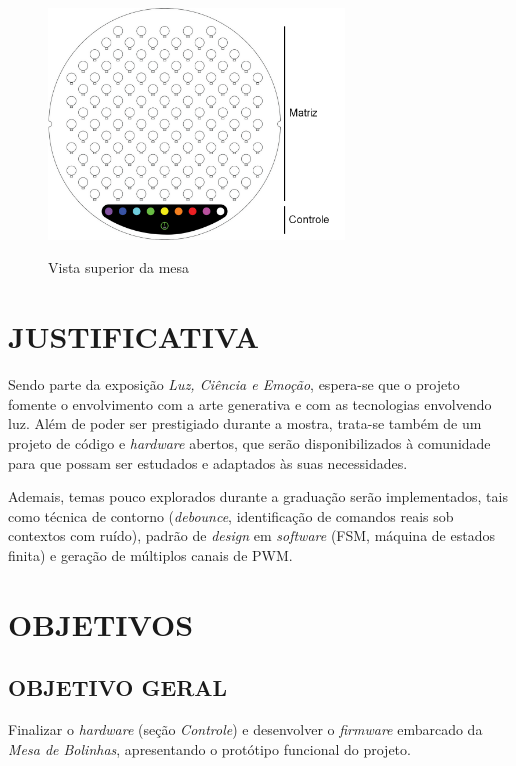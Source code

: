 \begin{figure}[H]%
    \centering
    \caption{Vista superior da mesa}
    \includegraphics[width=0.7\textwidth]{./dados/figuras/mesa-cad}
    \label{fig:mesa-sup}
\end{figure}

\section{JUSTIFICATIVA}
\label{sec:justificativa}

  Sendo parte da exposição \emph{Luz, Ciência e Emoção}, espera-se que o projeto fomente o envolvimento com a arte generativa e com as tecnologias envolvendo luz. Além de poder ser prestigiado durante a mostra, trata-se também de um projeto de código e \emph{hardware} abertos, que serão disponibilizados à comunidade para que possam ser estudados e adaptados às suas necessidades.

  Ademais, temas pouco explorados durante a graduação serão implementados, tais como técnica de contorno (\emph{debounce}, identificação de comandos reais sob contextos com ruído), padrão de \emph{design} em \emph{software} (FSM, máquina de estados finita) e geração de múltiplos canais de PWM.

\section{OBJETIVOS}
\label{sec:objetivos}

\subsection{OBJETIVO GERAL}
Finalizar o \emph{hardware} (seção \emph{Controle}) e desenvolver o \emph{firmware} embarcado da \emph{Mesa de Bolinhas}, apresentando o protótipo funcional do projeto.


